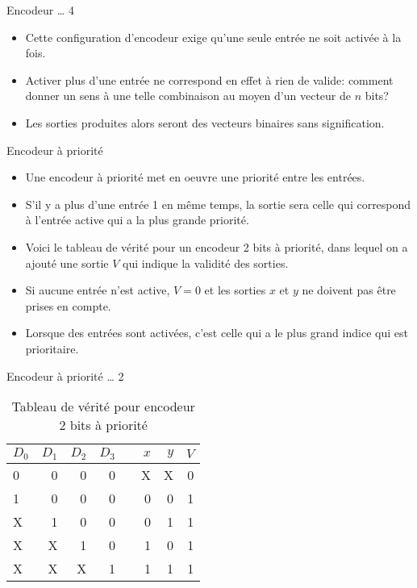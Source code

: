 \documentclass[presentation]{beamer}
\begin{document}
\begin{frame}[label={sec:org378948e}]{Encodeur \ldots{} 4}
\begin{itemize}
\item Cette configuration d'encodeur exige qu'une seule entrée ne soit activée à la fois.

\item Activer plus d'une entrée ne correspond en effet à rien de valide: comment donner un sens à une telle combinaison au moyen d'un vecteur de \(n\) bits?

\item Les sorties produites alors seront des vecteurs binaires sans signification.
\end{itemize}
\end{frame}

\begin{frame}[label={sec:org5ab7036}]{Encodeur à priorité}
\begin{itemize}
\item Une encodeur à priorité met en oeuvre une priorité entre les entrées.

\item S'il y a plus d'une entrée 1 en même temps, la sortie sera celle qui correspond à l'entrée active qui a la plus grande priorité.

\item Voici le tableau de vérité pour un encodeur 2 bits à priorité, dans lequel on a ajouté une sortie \(V\) qui indique la validité des sorties.

\item Si aucune entrée n'est active, \(V=0\) et les sorties \(x\) et \(y\) ne doivent pas être prises en compte.

\item Lorsque des entrées sont activées, c'est celle qui a le plus grand indice qui est prioritaire.
\end{itemize}
\end{frame}

\begin{frame}[label={sec:org82d118e}]{Encodeur à priorité \ldots{} 2}
\begin{table}[htbp]
\caption{\label{tab:org6f0aadb}Tableau de vérité pour encodeur 2 bits à priorité}
\centering
\begin{tabular}{lrrrlrrr}
\(D_0\) & \(D_1\) & \(D_2\) & \(D_3\) &  & \(x\) & \(y\) & \(V\)\\[0pt]
\hline
0 & 0 & 0 & 0 &  & X & X & 0\\[0pt]
1 & 0 & 0 & 0 &  & 0 & 0 & 1\\[0pt]
X & 1 & 0 & 0 &  & 0 & 1 & 1\\[0pt]
X & X & 1 & 0 &  & 1 & 0 & 1\\[0pt]
X & X & X & 1 &  & 1 & 1 & 1\\[0pt]
\end{tabular}
\end{table}
\end{frame}
\end{document}
